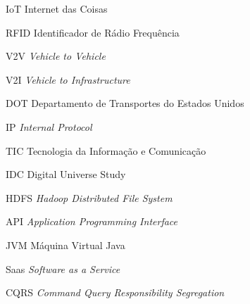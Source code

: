 \begin{siglas}
  \item[IoT] Internet das Coisas
  \item[RFID] Identificador de Rádio Frequência
  \item[V2V] \textit{Vehicle to Vehicle}
  \item[V2I] \textit{Vehicle to Infrastructure}
  \item[DOT] Departamento de Transportes do Estados Unidos
  \item[IP]  \textit{Internal Protocol}
  \item[TIC] Tecnologia da Informação e Comunicação
  \item[IDC] Digital Universe Study
  \item[HDFS] \textit{Hadoop Distributed File System}
  \item[API] \textit{Application Programming Interface}
  \item[JVM] Máquina Virtual Java
  \item[Saas] \textit{Software as a Service}
  \item[CQRS] \textit{Command Query Responsibility Segregation}
\end{siglas}